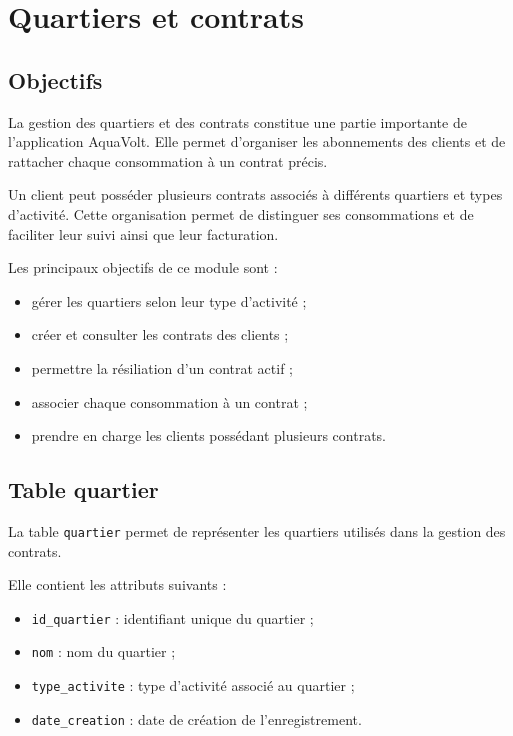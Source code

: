 
\chapter{Quartiers et contrats}
\label{chap:quartiers}

\section{Objectifs}

La gestion des quartiers et des contrats constitue une partie importante de l'application AquaVolt. Elle permet d'organiser les abonnements des clients et de rattacher chaque consommation à un contrat précis.

Un client peut posséder plusieurs contrats associés à différents quartiers et types d'activité. Cette organisation permet de distinguer ses consommations et de faciliter leur suivi ainsi que leur facturation.

Les principaux objectifs de ce module sont :
\begin{itemize}
    \item gérer les quartiers selon leur type d'activité ;
    \item créer et consulter les contrats des clients ;
    \item permettre la résiliation d'un contrat actif ;
    \item associer chaque consommation à un contrat ;
    \item prendre en charge les clients possédant plusieurs contrats.
\end{itemize}

\section{Table quartier}

La table \texttt{quartier} permet de représenter les quartiers utilisés dans la gestion des contrats.

Elle contient les attributs suivants :
\begin{itemize}
    \item \texttt{id\_quartier} : identifiant unique du quartier ;
    \item \texttt{nom} : nom du quartier ;
    \item \texttt{type\_activite} : type d'activité associé au quartier ;
    \item \texttt{date\_creation} : date de création de l'enregistrement.
\end{itemize}

